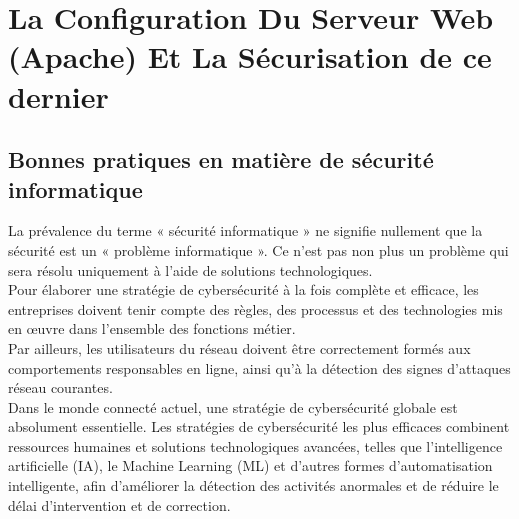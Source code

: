 \chapter{La Configuration Du Serveur Web (Apache) Et La Sécurisation de ce dernier }


\section{Bonnes pratiques en matière de sécurité informatique}

La prévalence du terme « sécurité informatique » ne signifie nullement que la sécurité est un « problème informatique ». Ce n’est pas non plus un problème qui sera résolu uniquement à l’aide de solutions technologiques.\\ Pour élaborer une stratégie de cybersécurité à la fois complète et efficace, les entreprises doivent tenir compte des règles, des processus et des technologies mis en œuvre dans l’ensemble des fonctions métier.\\ Par ailleurs, les utilisateurs du réseau doivent être correctement formés aux comportements responsables en ligne, ainsi qu’à la détection des signes d’attaques réseau courantes.\\

Dans le monde connecté actuel, une stratégie de cybersécurité globale est absolument essentielle. Les stratégies de cybersécurité les plus efficaces combinent ressources humaines et solutions technologiques avancées, telles que l’intelligence artificielle (IA), le Machine Learning (ML) et d’autres formes d’automatisation intelligente, afin d’améliorer la détection des activités anormales et de réduire le délai d’intervention et de correction.\\

